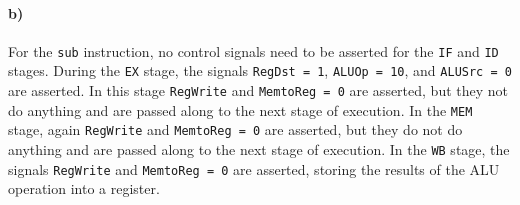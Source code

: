 \documentclass[12pt]{article}
\begin{document}
\paragraph{b)}

For the \texttt{sub} instruction, no control signals need to be asserted for the \texttt{IF} and \texttt{ID} stages. During the \texttt{EX} stage, the signals
\texttt{RegDst = 1}, \texttt{ALUOp = 10}, and \texttt{ALUSrc = 0} are asserted. In this stage \texttt{RegWrite} and \texttt{MemtoReg = 0} are asserted, but they
not do anything and are passed along to the next stage of execution. In the \texttt{MEM} stage, again \texttt{RegWrite} and \texttt{MemtoReg = 0} are asserted,
but they do not do anything and are passed along to the next stage of execution. In the \texttt{WB} stage, the signals \texttt{RegWrite} and \texttt{MemtoReg = 0}
are asserted, storing the results of the ALU operation into a register.
\end{document}
